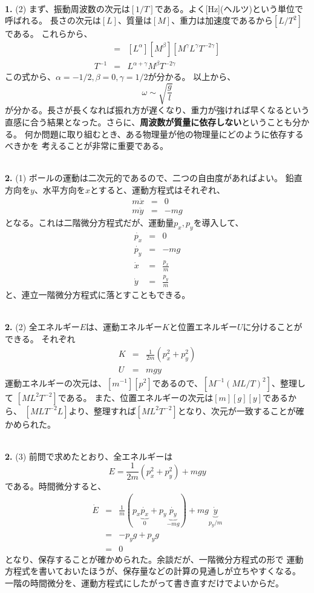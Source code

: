 \documentclass{jarticle}
\newcommand{\ans}[2]{\noindent\\ {\bf \large #1.} (#2)}
\begin{document}
\ans{1}{2}
まず、振動周波数の次元は$[1/T]$である。よく[Hz](ヘルツ)という単位で呼ばれる。
長さの次元は$[L]$、質量は$[M]$、重力は加速度であるから$[L/T^2]$である。
これらから、
\begin{eqnarray}
  [1/T] &=& [L^\alpha] [M^\beta] [M^\gamma L^\gamma T^{-2\gamma}]\\
  T^{-1} &=& L^{\alpha+\gamma} M^{\beta} T^{-2\gamma}
\end{eqnarray}
この式から、$\alpha = -1/2, \beta = 0, \gamma = 1/2$が分かる。
以上から、
\begin{equation}
  \omega \sim \sqrt{\frac{g}{l}}
\end{equation}
が分かる。長さが長くなれば振れ方が遅くなり、重力が強ければ早くなるという
直感に合う結果となった。さらに、{\bf 周波数が質量に依存しない}ということも分かる。
何か問題に取り組むとき、ある物理量が他の物理量にどのように依存するべきかを
考えることが非常に重要である。

\ans{2}{1}
ボールの運動は二次元的であるので、二つの自由度があればよい。
鉛直方向を$y$、水平方向を$x$とすると、運動方程式はそれぞれ、
\begin{eqnarray}
  m\ddot{x} &=& 0\\
  m\ddot{y} &=& -mg
\end{eqnarray}
となる。これは二階微分方程式だが、運動量$p_x,p_y$を導入して、
\begin{eqnarray}
  \dot{p_x} &=& 0\\
  \dot{p_y} &=& -mg \\
  \dot{x} &=& \frac{p_x}{m}\\
  \dot{y} &=& \frac{p_y}{m}
\end{eqnarray}
と、連立一階微分方程式に落とすこともできる。

\ans{2}{2}
全エネルギー$E$は、運動エネルギー$K$と位置エネルギー$U$に分けることができる。
それぞれ
\begin{eqnarray}
  K &=& \frac{1}{2m} \left( p_x^2 +  p_y^2 \right)\\
  U &=& mgy
\end{eqnarray}
運動エネルギーの次元は、$[m^{-1}][p^2]$であるので、$[M^{-1} (ML/T)^2]$、整理して
$[M L^2 T^{-2}]$である。
また、位置エネルギーの次元は$[m][g][y]$であるから、
$[M LT^{-2} L]$より、整理すれば$[M L^2 T^{-2}]$となり、次元が一致することが確かめられた。

\ans{2}{3}
前問で求めたとおり、全エネルギーは
\begin{equation}
  E = \frac{1}{2m} \left( p_x^2 +  p_y^2 \right) + mgy
\end{equation}
である。時間微分すると、
\begin{eqnarray}
  \dot{E} &=& \frac{1}{m} ( p_x \underbrace{\dot{p_x}}_{0} +  p_y \underbrace{\dot{p_y}}_{-mg}) + mg\underbrace{\dot{y}}_{p_y/m} \\
  &=& - p_y g + p_y g\\
  &=& 0
\end{eqnarray}
となり、保存することが確かめられた。余談だが、一階微分方程式の形で
運動方程式を書いておいたほうが、保存量などの計算の見通しが立ちやすくなる。
一階の時間微分を、運動方程式にしたがって書き直すだけでよいからだ。
\end{document}

